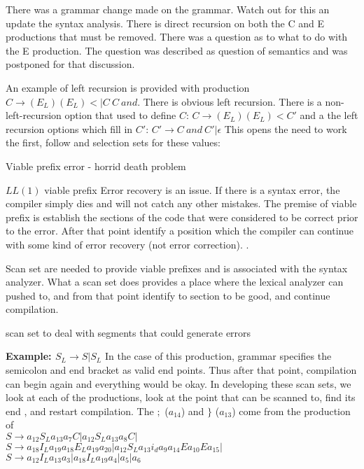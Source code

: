 There was a grammar change made on the grammar.  Watch out for this an update the syntax analysis. 
There is direct recursion on both the C and E productions that must be removed.   There was a question as to what to do with the E production.  The question was described as question of semantics and was postponed for that discussion.  


An example of left recursion is provided with production $C\to (E_L)(E_L) < | C\  C\ and$.  There is obvious left recursion.  There is a non-left-recursion option that used to define $C$:
$C \to (E_L) (E_L) < C'$
and a the left recursion options which fill in $C'$:  
$C' \to C\ and\ C' | \epsilon$  This opens the need to work the first, follow and selection sets for these values:

 
 
  
 Viable prefix error  - horrid death problem
 
 $LL(1)$ viable prefix Error recovery is an issue.  If there is a syntax error, the compiler simply dies and will not catch any other mistakes.  The premise of viable prefix is establish the sections of the code that were considered to be correct prior to the error.  After that point identify a position which the compiler can continue with some kind of error recovery (not error correction).  .  
 
 Scan set are needed to provide viable prefixes and is associated with the syntax analyzer.  What a scan set does provides a place where the lexical analyzer can pushed to, and from that point identify to section to be good, and continue compilation.  
 
 scan set to deal with segments that could generate errors 
 
 \textbf {Example: $S_L\to S | S_L$}
 In the case of this production, grammar specifies the semicolon and end bracket as valid end points.  Thus after that point, compilation can begin again and everything would be okay.  In developing these scan sets, we look at each of the productions,  look at the point that can be scanned to, find its end , and restart compilation.  The $;$ ($a_{14}$) and $\}$ ($a_13$)  come from the production of 
 \\
 $S\to a_{12} S_L a_{13} a_7 C | a_{12} S_L a_{13} a_8 C | $ \\
 $S \to  a_{18} I_L a_{19}a_{18} E_L a_{19} a_{20} | a_{12} S_L a_{13}  i_d a_{9} a_{14} E a_{10} E a_{15} |$  \\
 $S \to  a_{12} I_L a_{13} a_3 | a_{18} I_L a_{19} a_4 | a_5 | a_6 $
 
